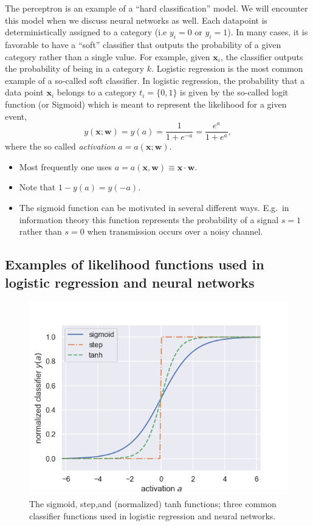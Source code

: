 \documentclass[%
oneside,                 %
final,                   %
10pt]{article}
\begin{document}
The perceptron is an example of a ``hard classification'' model. We
will encounter this model when we discuss neural networks as
well. Each datapoint is deterministically assigned to a category (i.e
$y_i=0$ or $y_i=1$). In many cases, it is favorable to have a ``soft''
classifier that outputs the probability of a given category rather
than a single value. For example, given $\boldsymbol{x}_i$, the classifier
outputs the probability of being in a category $k$.  Logistic regression
is the most common example of a so-called soft classifier. In logistic
regression, the probability that a data point $\boldsymbol{x}_i$
belongs to a category $t_i=\{0,1\}$ is given by the so-called logit function (or Sigmoid) which is meant to represent the likelihood for a given event, 
\[
y(\boldsymbol{x}; \boldsymbol{w}) = y(a) = \frac{1}{1+e^{-a}} = \frac{e^a}{1+e^a},
\]
where the so called \emph{activation} $a = a(\boldsymbol{x}; \boldsymbol{w})$. 

\begin{itemize}
\item Most frequently one uses $a = a(\boldsymbol{x}, \boldsymbol{w}) \equiv \boldsymbol{x} \cdot \boldsymbol{w}$.

\item Note that $1-y(a)= y(-a)$.

\item The sigmoid function can be motivated in several different ways. E.g.~in information theory this function represents the probability of a signal $s=1$ rather than $s=0$ when transmission occurs over a noisy channel.
\end{itemize}

\noindent
\subsection{Examples of likelihood functions used in logistic regression and neural networks}


\begin{figure}[!ht]  %
  \centerline{\includegraphics[width=0.8\linewidth]{fig/logistic_functions.png}}
  \caption{
  The sigmoid, step,and (normalized) tanh functions; three common classifier functions used in logistic regression and neural networks. \label{fig:logistic}
  }
\end{figure}
\end{document}
